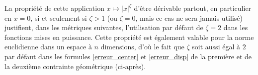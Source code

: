 
\vspace{-4.0mm}
\noindent La propriété de cette application $x \mapsto |x|^\zeta$ d'être dérivable partout, en particulier en $x=0$, si et seulement si $\zeta>1$ (ou $\zeta=0$, mais ce cas ne sera jamais utilisé) justifient, dans les métriques suivantes, l'utilisation par défaut de $\zeta=2$ dans les fonctions mises en puissance. Cette propriété est également valable pour la norme euclidienne dans un espace à $n$ dimensions, d'où le fait que $\zeta$ soit aussi égal à $2$ par défaut dans les formules \ref{erreur_center} et \ref{erreur_disp} de la première et de la deuxième contrainte géométrique (ci-après).


